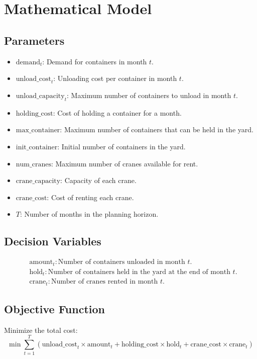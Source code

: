 \documentclass{article}
\begin{document}
\section*{Mathematical Model}

\subsection*{Parameters}
\begin{itemize}
    \item $\text{demand}_{t}$: Demand for containers in month $t$.
    \item $\text{unload\_cost}_{t}$: Unloading cost per container in month $t$.
    \item $\text{unload\_capacity}_{t}$: Maximum number of containers to unload in month $t$.
    \item $\text{holding\_cost}$: Cost of holding a container for a month.
    \item $\text{max\_container}$: Maximum number of containers that can be held in the yard.
    \item $\text{init\_container}$: Initial number of containers in the yard.
    \item $\text{num\_cranes}$: Maximum number of cranes available for rent.
    \item $\text{crane\_capacity}$: Capacity of each crane.
    \item $\text{crane\_cost}$: Cost of renting each crane.
    \item $T$: Number of months in the planning horizon.
\end{itemize}

\subsection*{Decision Variables}
\begin{align*}
    & \text{amount}_{t}: \text{Number of containers unloaded in month } t. \\
    & \text{hold}_{t}: \text{Number of containers held in the yard at the end of month } t. \\
    & \text{crane}_{t}: \text{Number of cranes rented in month } t.
\end{align*}

\subsection*{Objective Function}
Minimize the total cost:
\[
\min \sum_{t=1}^{T} \left( \text{unload\_cost}_{t} \times \text{amount}_{t} + \text{holding\_cost} \times \text{hold}_{t} + \text{crane\_cost} \times \text{crane}_{t} \right)
\]
\end{document}

